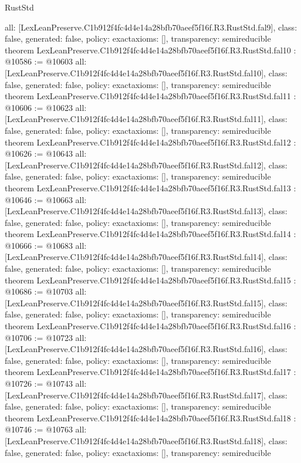 \begin{lexlean}{RustStd}
\begin{coremodule}
{  all: [LexLeanPreserve.C1b912f4fc4d4e14a28bfb70aeef5f16f.R3.RustStd.fal9],
  class: false,
  generated: false,
  policy: exact{axioms: []},
  transparency: semireducible
}
theorem LexLeanPreserve.C1b912f4fc4d4e14a28bfb70aeef5f16f.R3.RustStd.fal10 : @10586 := @10603 {
  all: [LexLeanPreserve.C1b912f4fc4d4e14a28bfb70aeef5f16f.R3.RustStd.fal10],
  class: false,
  generated: false,
  policy: exact{axioms: []},
  transparency: semireducible
}
theorem LexLeanPreserve.C1b912f4fc4d4e14a28bfb70aeef5f16f.R3.RustStd.fal11 : @10606 := @10623 {
  all: [LexLeanPreserve.C1b912f4fc4d4e14a28bfb70aeef5f16f.R3.RustStd.fal11],
  class: false,
  generated: false,
  policy: exact{axioms: []},
  transparency: semireducible
}
theorem LexLeanPreserve.C1b912f4fc4d4e14a28bfb70aeef5f16f.R3.RustStd.fal12 : @10626 := @10643 {
  all: [LexLeanPreserve.C1b912f4fc4d4e14a28bfb70aeef5f16f.R3.RustStd.fal12],
  class: false,
  generated: false,
  policy: exact{axioms: []},
  transparency: semireducible
}
theorem LexLeanPreserve.C1b912f4fc4d4e14a28bfb70aeef5f16f.R3.RustStd.fal13 : @10646 := @10663 {
  all: [LexLeanPreserve.C1b912f4fc4d4e14a28bfb70aeef5f16f.R3.RustStd.fal13],
  class: false,
  generated: false,
  policy: exact{axioms: []},
  transparency: semireducible
}
theorem LexLeanPreserve.C1b912f4fc4d4e14a28bfb70aeef5f16f.R3.RustStd.fal14 : @10666 := @10683 {
  all: [LexLeanPreserve.C1b912f4fc4d4e14a28bfb70aeef5f16f.R3.RustStd.fal14],
  class: false,
  generated: false,
  policy: exact{axioms: []},
  transparency: semireducible
}
theorem LexLeanPreserve.C1b912f4fc4d4e14a28bfb70aeef5f16f.R3.RustStd.fal15 : @10686 := @10703 {
  all: [LexLeanPreserve.C1b912f4fc4d4e14a28bfb70aeef5f16f.R3.RustStd.fal15],
  class: false,
  generated: false,
  policy: exact{axioms: []},
  transparency: semireducible
}
theorem LexLeanPreserve.C1b912f4fc4d4e14a28bfb70aeef5f16f.R3.RustStd.fal16 : @10706 := @10723 {
  all: [LexLeanPreserve.C1b912f4fc4d4e14a28bfb70aeef5f16f.R3.RustStd.fal16],
  class: false,
  generated: false,
  policy: exact{axioms: []},
  transparency: semireducible
}
theorem LexLeanPreserve.C1b912f4fc4d4e14a28bfb70aeef5f16f.R3.RustStd.fal17 : @10726 := @10743 {
  all: [LexLeanPreserve.C1b912f4fc4d4e14a28bfb70aeef5f16f.R3.RustStd.fal17],
  class: false,
  generated: false,
  policy: exact{axioms: []},
  transparency: semireducible
}
theorem LexLeanPreserve.C1b912f4fc4d4e14a28bfb70aeef5f16f.R3.RustStd.fal18 : @10746 := @10763 {
  all: [LexLeanPreserve.C1b912f4fc4d4e14a28bfb70aeef5f16f.R3.RustStd.fal18],
  class: false,
  generated: false,
  policy: exact{axioms: []},
  transparency: semireducible
}
\end{coremodule}
\end{lexlean}

